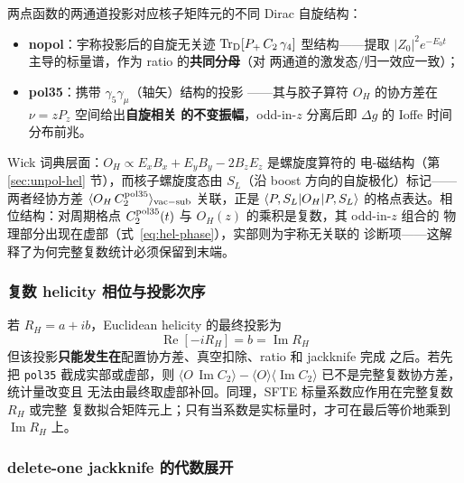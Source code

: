\documentclass[11pt,a4paper]{ctexart}
\newcommand{\code}[1]{\texttt{#1}}
\begin{document}
两点函数的两通道投影对应核子矩阵元的不同 Dirac 自旋结构：
\begin{itemize}
  \item \textbf{nopol}：宇称投影后的自旋无关迹
  $\operatorname{Tr}_{\rm D}[P_+\,C_2\,\gamma_4]$ 型结构——提取
  $|Z_0|^2e^{-E_0 t}$ 主导的标量谱，作为 ratio 的\textbf{共同分母}（对
  两通道的激发态/归一效应一致）；
  \item \textbf{pol35}：携带 $\gamma_5\gamma_\mu$（轴矢）结构的投影
  ——其与胶子算符 $O_H$ 的协方差在 $\nu=zP_z$ 空间给出\textbf{自旋相关
  的不变振幅}，odd-in-$z$ 分离后即 $\Delta g$ 的 Ioffe 时间分布前兆。
\end{itemize}
Wick 词典层面：$O_H\propto E_xB_x+E_yB_y-2B_zE_z$ 是螺旋度算符的
电-磁结构（第 \ref{sec:unpol-hel} 节），而核子螺旋度态由
$S_L$（沿 boost 方向的自旋极化）标记——两者经协方差
$\langle O_H\,C_2^{\rm pol35}\rangle_{\rm vac-sub}$ 关联，正是
$\braket{P,S_L|O_H|P,S_L}$ 的格点表达。相位结构：对周期格点
$C_2^{\rm pol35}(t)$ 与 $O_H(z)$ 的乘积是复数，其 odd-in-$z$ 组合的
物理部分出现在虚部（式~\eqref{eq:hel-phase}），实部则为宇称无关联的
诊断项——这解释了为何完整复数统计必须保留到末端。

\subsubsection{复数 helicity 相位与投影次序}

若 $R_H=a+ib$，Euclidean helicity 的最终投影为
\begin{equation}\label{eq:hel-phase}
\operatorname{Re}[-iR_H]=b=\operatorname{Im}R_H
\end{equation}
但该投影\textbf{只能发生在}配置协方差、真空扣除、ratio 和 jackknife 完成
之后。若先把 \code{pol35} 截成实部或虚部，则
$\langle O\,\operatorname{Im}C_2\rangle-\langle O\rangle
\langle\operatorname{Im}C_2\rangle$ 已不是完整复数协方差，统计量改变且
无法由最终取虚部补回。同理，SFTE 标量系数应作用在完整复数 $R_H$ 或完整
复数拟合矩阵元上；只有当系数是实标量时，才可在最后等价地乘到
$\operatorname{Im}R_H$ 上。

\subsubsection{delete-one jackknife 的代数展开}
\end{document}
